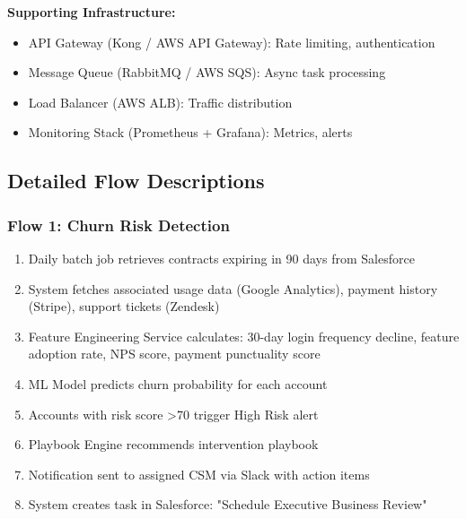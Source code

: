 \documentclass[12pt,a4paper]{article}
\begin{document}
\textbf{Supporting Infrastructure:}
\begin{itemize}
    \item API Gateway (Kong / AWS API Gateway): Rate limiting, authentication
    \item Message Queue (RabbitMQ / AWS SQS): Async task processing
    \item Load Balancer (AWS ALB): Traffic distribution
    \item Monitoring Stack (Prometheus + Grafana): Metrics, alerts
\end{itemize}

\subsection{Detailed Flow Descriptions}
\subsubsection{Flow 1: Churn Risk Detection}
\begin{enumerate}
    \item Daily batch job retrieves contracts expiring in 90 days from Salesforce
    \item System fetches associated usage data (Google Analytics), payment history (Stripe), support tickets (Zendesk)
    \item Feature Engineering Service calculates: 30-day login frequency decline, feature adoption rate, NPS score, payment punctuality score
    \item ML Model predicts churn probability for each account
    \item Accounts with risk score >70 trigger High Risk alert
    \item Playbook Engine recommends intervention playbook
    \item Notification sent to assigned CSM via Slack with action items
    \item System creates task in Salesforce: "Schedule Executive Business Review"
\end{enumerate}
\end{document}
